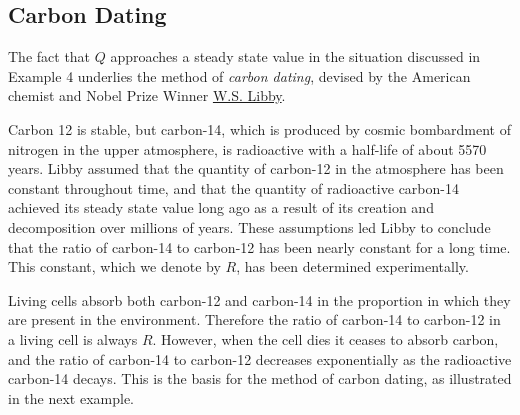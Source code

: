\documentclass{ximera}
\begin{document}


\subsection*{Carbon Dating}

The fact that $Q$ approaches a steady state value in the
situation discussed in Example 4 underlies the method of \textit{carbon dating}, devised by the American chemist and Nobel Prize Winner
\href{http://www.nobelprize.org/nobel_prizes/chemistry/laureates/1960/libby-lecture.pdf}{W.S. Libby}.

Carbon 12 is stable, but carbon-14, which is produced by cosmic
bombardment of nitrogen in the upper atmosphere, is radioactive with a
half-life of about 5570 years. Libby assumed that the
quantity
of carbon-12 in the atmosphere has been constant throughout time, and
that the quantity of radioactive carbon-14 achieved its steady state
value long ago as a result of its creation and decomposition over
millions of years. These assumptions led Libby to conclude that the
ratio of carbon-14 to carbon-12 has been nearly constant for a long
time. This constant, which we denote by $R$, has been determined
experimentally.

Living cells absorb both carbon-12 and carbon-14 in the proportion in
which they are present in the environment. Therefore the ratio of
carbon-14 to carbon-12 in a living cell is always $R$. However, when
the cell dies it ceases to absorb carbon, and the ratio of carbon-14
to carbon-12 decreases exponentially as the radioactive carbon-14
decays. This is the basis for the method of carbon dating, as
illustrated in the next example.
\end{document}
